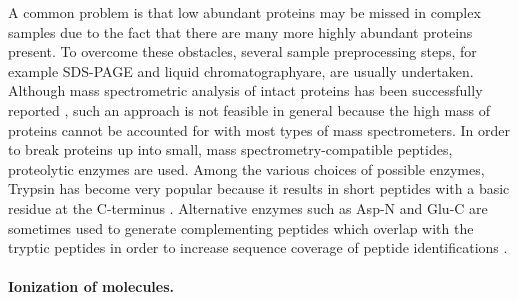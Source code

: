 A common problem is that low abundant proteins may be missed in complex samples 
due to the fact that there are many more highly abundant proteins present.
To overcome these obstacles, several sample preprocessing steps, for example 
SDS-PAGE and liquid chromatographyare, are usually undertaken.
Although mass spectrometric analysis of intact proteins has been successfully
reported \citep{Lee2002, Taylor2003}, such an approach is not feasible in 
general because the high mass of proteins cannot be accounted for with most
types of mass spectrometers.
In order to break proteins up into small, mass spectrometry-compatible peptides, 
proteolytic enzymes are used.
Among the various choices of possible enzymes, Trypsin has become very popular
because it results in short peptides with a basic residue at the C-terminus
\citep{Olsen2004}.
Alternative enzymes such as Asp-N and Glu-C are sometimes used to generate
complementing peptides which overlap with the tryptic peptides in order to 
increase sequence coverage of peptide identifications \citep{Steen2004}.

% 

\paragraph{Ionization of molecules.}

